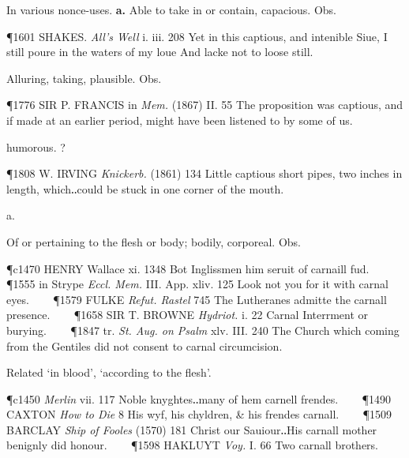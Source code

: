 \begin{description}[wide, labelwidth=!, labelindent=0pt]
\begin{myenumerate}
 In various nonce-uses. \textbf{a.} Able to take in or contain, capacious. Obs.

\P 1601 SHAKES.  \textit{All's Well} i. iii. 208 Yet in this captious, and intenible Siue, I still poure in the waters of my loue And lacke not to loose still.

 Alluring, taking, plausible. Obs.

\P 1776 SIR P. FRANCIS in \textit{Mem.} (1867) II. 55 The proposition was captious, and if made at an earlier period, might have been listened to by some of us.

 humorous. ?

\P 1808 W. IRVING  \textit{Knickerb.} (1861) 134 Little captious short pipes, two inches in length, which‥could be stuck in one corner of the mouth.
\end{myenumerate}


 a.

\noindent {}

\vspace{-0.3cm}

\begin{myenumerate}

 Of or pertaining to the flesh or body; bodily, corporeal. Obs.

\P c1470 HENRY Wallace xi. 1348 Bot  Inglissmen him seruit of carnaill fud.    
\P 1555 in Strype  \textit{Eccl. Mem.} III. App. xliv. 125 Look not you for it with carnal eyes.    
\P 1579 FULKE  \textit{Refut. Rastel} 745 The Lutheranes admitte the carnall presence.    
\P 1658 SIR T. BROWNE  \textit{Hydriot.} i. 22 Carnal Interrment or burying.    
\P 1847 tr. \textit{St. Aug. on Psalm} xlv. III. 240 The Church which coming from the Gentiles did not consent to carnal circumcision.

 Related ‘in blood’, ‘according to the flesh’.

\P c1450 \textit{Merlin}  vii. 117 Noble knyghtes‥many of hem carnell frendes.    
\P 1490 CAXTON  \textit{How to Die} 8 His wyf, his chyldren, \& his frendes carnall.    
\P 1509 BARCLAY  \textit{Ship of Fooles} (1570) 181 Christ our Sauiour‥His carnall mother benignly did honour.    
\P 1598 HAKLUYT  \textit{Voy.} I. 66 Two carnall brothers.


\end{myenumerate}
\end{description}
